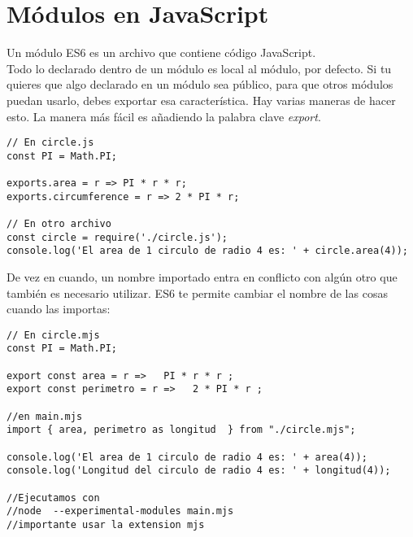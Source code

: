 \documentclass[4paper]{article}
\newcommand{\J}{JavaScript}
\begin{document}
\section{Módulos en \J}
Un módulo ES6 es un archivo que contiene código \J. \\
Todo lo declarado dentro de un módulo es local al módulo, por defecto. Si tu quieres que algo declarado en un módulo sea público, para que otros módulos puedan usarlo, debes exportar esa característica. Hay varias maneras de hacer esto. La manera más fácil es añadiendo la palabra clave \emph{export}.\\
\begin{lstlisting}
// En circle.js
const PI = Math.PI;

exports.area = r => PI * r * r;
exports.circumference = r => 2 * PI * r;

// En otro archivo
const circle = require('./circle.js');
console.log('El area de 1 circulo de radio 4 es: ' + circle.area(4));
\end{lstlisting}
De vez en cuando, un nombre importado entra en conflicto con algún otro que también es necesario utilizar. ES6 te permite cambiar el nombre de las cosas cuando las importas:
\begin{lstlisting}
// En circle.mjs
const PI = Math.PI;

export const area = r =>   PI * r * r ;
export const perimetro = r =>   2 * PI * r ;

//en main.mjs
import { area, perimetro as longitud  } from "./circle.mjs";

console.log('El area de 1 circulo de radio 4 es: ' + area(4));
console.log('Longitud del circulo de radio 4 es: ' + longitud(4));

//Ejecutamos con
//node  --experimental-modules main.mjs
//importante usar la extension mjs
\end{lstlisting}
\end{document}

